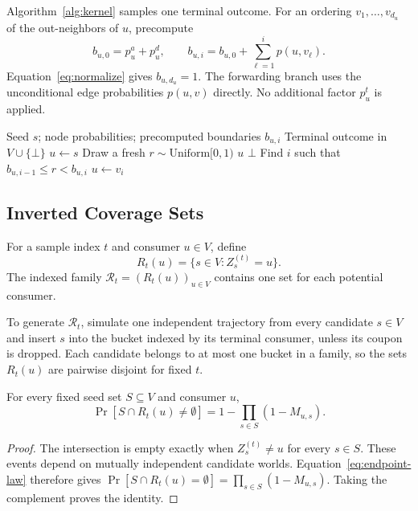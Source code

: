 Algorithm~\ref{alg:kernel} samples one terminal outcome. For an ordering
$v_1,\ldots,v_{d_u}$ of the out-neighbors of $u$, precompute
\[
 b_{u,0}=p_u^a+p_u^d,\qquad
 b_{u,i}=b_{u,0}+\sum_{\ell=1}^{i}p(u,v_\ell).
\]
Equation~\eqref{eq:normalize} gives $b_{u,d_u}=1$.
The forwarding branch uses the unconditional edge probabilities
$p(u,v)$ directly. No additional factor $p_u^t$ is applied.

\begin{algorithm}[t]
\caption{\textsc{SampleTerminalConsumer}$(s)$}
\label{alg:kernel}
\begin{algorithmic}[1]
\Require Seed $s$; node probabilities; precomputed boundaries $b_{u,i}$
\Ensure Terminal outcome in $V\cup\{\bot\}$
\State $u\gets s$
  \State Draw a fresh $r\sim\mathrm{Uniform}[0,1)$
    \State \Return $u$
    \State \Return $\bot$
  \Else
    \State Find $i$ such that $b_{u,i-1}\le r<b_{u,i}$
    \State $u\gets v_i$
  \EndIf
\EndWhile
\end{algorithmic}
\end{algorithm}

\subsection{Inverted Coverage Sets}
\label{sec:reverse-coverage}

\begin{definition}
For a sample index $t$ and consumer $u\in V$, define
\begin{equation}
\label{eq:reverse-set-def}
  R_t(u)=\{s\in V:Z_s^{(t)}=u\}.
\end{equation}
The indexed family $\mathcal R_t=(R_t(u))_{u\in V}$ contains one
set for each potential consumer.
\end{definition}

To generate $\mathcal R_t$, simulate one independent trajectory
from every candidate $s\in V$ and insert $s$ into the bucket
indexed by its terminal consumer, unless its coupon is dropped.
Each candidate belongs to at most one bucket in a family, so the
sets $R_t(u)$ are pairwise disjoint for fixed $t$.

\begin{lemma}
\label{lem:coverage}
For every fixed seed set $S\subseteq V$ and consumer $u$,
\begin{equation}
\label{eq:reverse-coverage}
 \Pr[S\cap R_t(u)\ne\emptyset]
 =1-\prod_{s\in S}(1-M_{u,s}).
\end{equation}
\end{lemma}
\begin{proof}
The intersection is empty exactly when $Z_s^{(t)}\ne u$ for
every $s\in S$. These events depend on mutually independent
candidate worlds. Equation~\eqref{eq:endpoint-law} therefore gives
$\Pr[S\cap R_t(u)=\emptyset]=\prod_{s\in S}(1-M_{u,s})$.
Taking the complement proves the identity.
\end{proof}

